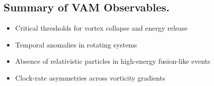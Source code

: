 \subsection{Summary of VAM Observables.}
\begin{itemize}
    \item Critical thresholds for vortex collapse and energy release
    \item Temporal anomalies in rotating systems
    \item Absence of relativistic particles in high-energy fusion-like events
    \item Clock-rate asymmetries across vorticity gradients
\end{itemize}